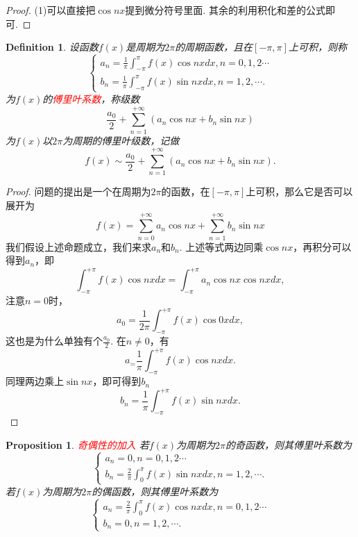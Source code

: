 \documentclass{article}
\newtheorem{proposition}[theorem]{Proposition}
\newtheorem{definition}[theorem]{Definition}
\newcommand{\redt}[1]{\textcolor{red}{#1}}
\begin{document}
\begin{proof}
\rm (1)可以直接把$\cos nx$提到微分符号里面. 其余的利用积化和差的公式即可. 
\end{proof}

\begin{definition}
\rm 设函数$f(x)$是周期为$2\pi$的周期函数，且在$[-\pi,\pi]$上可积，则称
$$
\left\{
\begin{array}{ll}
a_n = \frac{1}{\pi} \int_{-\pi}^{\pi} f(x)\cos nxdx, n =  0,1,2\cdots \\
b_n = \frac{1}{\pi} \int_{-\pi}^{\pi} f(x)\sin nxdx, n = 1,2,\cdots.
\end{array} \right.
$$
为$f(x)$的\redt{傅里叶系数}，称级数
$$
\frac{a_0}{2} + \sum\limits_{n=1}^{+\infty}(a_n\cos nx + b_n \sin nx)
$$
为$f(x)$以$2\pi$为周期的傅里叶级数，记做
$$
f(x) \sim \frac{a_0}{2} +  \sum\limits_{n=1}^{+\infty}(a_n\cos nx + b_n \sin nx).
$$
\end{definition}

\begin{proof}
\rm 问题的提出是一个在周期为$2\pi$的函数，在$[-\pi,\pi]$上可积，那么它是否可以展开为
$$
f(x) =\sum\limits_{n=0}^{+\infty}a_n\cos nx + \sum\limits_{n=1}^{+\infty}b_n\sin nx
$$
我们假设上述命题成立，我们来求$a_n$和$b_n$. 上述等式两边同乘$\cos nx$，再积分可以得到$a_n$，即
$$
\int_{-\pi}^{+\pi} f(x) \cos nxdx = \int_{-\pi}^{+\pi} a_n\cos nx\cos nx dx,
$$
注意$n=0$时，
$$
a_0 = \frac{1}{2\pi} \int_{-\pi}^{+\pi} f(x) \cos 0xdx,
$$
这也是为什么单独有个$\frac{a_0}{2}$. 在$n \neq 0$，有
$$
a_= \frac{1}{\pi} \int_{-\pi}^{+\pi} f(x) \cos nx dx.
$$
同理两边乘上$\sin nx$，即可得到$b_n$
$$
b_n = \frac{1}{\pi} \int_{-\pi}^{+\pi} f(x) \sin nx dx.
$$
\end{proof}

\begin{proposition}
\rm \redt{奇偶性的加入} 若$f(x)$为周期为$2\pi$的奇函数，则其傅里叶系数为
$$
\left\{
\begin{array}{ll}
a_n = 0, n =  0,1,2\cdots \\
b_n = \frac{2}{\pi} \int_{0}^{\pi} f(x)\sin nxdx, n = 1,2,\cdots.
\end{array} \right.
$$
若$f(x)$为周期为$2\pi$的偶函数，则其傅里叶系数为
$$
\left\{
\begin{array}{ll}
a_n = \frac{2}{\pi} \int_{0}^{\pi} f(x)\cos nxdx, n =  0,1,2\cdots \\
b_n = 0 , n = 1,2,\cdots.
\end{array} \right.
$$
\end{proposition}
\end{document}

